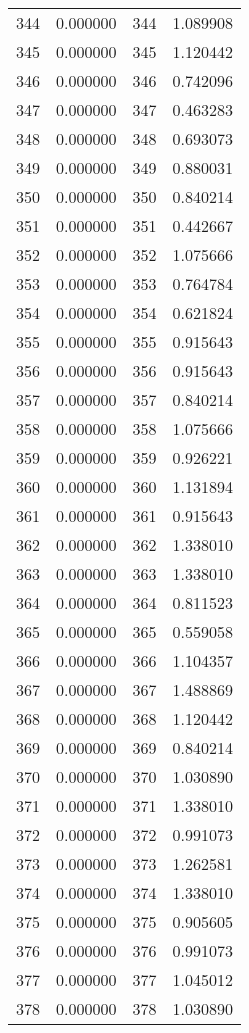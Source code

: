 \documentclass[12pt]{article}
\begin{document}
\begin{longtable}{@{}cccc@{}}
344 & 0.000000 & 344 & 1.089908 \\
345 & 0.000000 & 345 & 1.120442 \\
346 & 0.000000 & 346 & 0.742096 \\
347 & 0.000000 & 347 & 0.463283 \\
348 & 0.000000 & 348 & 0.693073 \\
349 & 0.000000 & 349 & 0.880031 \\
350 & 0.000000 & 350 & 0.840214 \\
351 & 0.000000 & 351 & 0.442667 \\
352 & 0.000000 & 352 & 1.075666 \\
353 & 0.000000 & 353 & 0.764784 \\
354 & 0.000000 & 354 & 0.621824 \\
355 & 0.000000 & 355 & 0.915643 \\
356 & 0.000000 & 356 & 0.915643 \\
357 & 0.000000 & 357 & 0.840214 \\
358 & 0.000000 & 358 & 1.075666 \\
359 & 0.000000 & 359 & 0.926221 \\
360 & 0.000000 & 360 & 1.131894 \\
361 & 0.000000 & 361 & 0.915643 \\
362 & 0.000000 & 362 & 1.338010 \\
363 & 0.000000 & 363 & 1.338010 \\
364 & 0.000000 & 364 & 0.811523 \\
365 & 0.000000 & 365 & 0.559058 \\
366 & 0.000000 & 366 & 1.104357 \\
367 & 0.000000 & 367 & 1.488869 \\
368 & 0.000000 & 368 & 1.120442 \\
369 & 0.000000 & 369 & 0.840214 \\
370 & 0.000000 & 370 & 1.030890 \\
371 & 0.000000 & 371 & 1.338010 \\
372 & 0.000000 & 372 & 0.991073 \\
373 & 0.000000 & 373 & 1.262581 \\
374 & 0.000000 & 374 & 1.338010 \\
375 & 0.000000 & 375 & 0.905605 \\
376 & 0.000000 & 376 & 0.991073 \\
377 & 0.000000 & 377 & 1.045012 \\
378 & 0.000000 & 378 & 1.030890 \\

\end{longtable}
\end{document}
